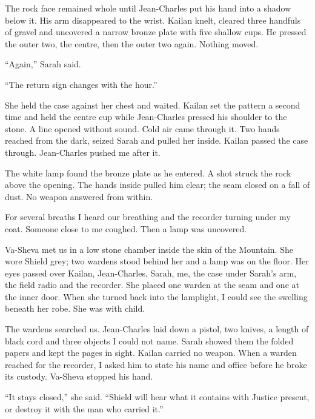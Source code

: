 The rock face remained whole until Jean-Charles put his hand into a shadow below it. His arm disappeared to the wrist. Kailan knelt, cleared three handfuls of gravel and uncovered a narrow bronze plate with five shallow cups. He pressed the outer two, the centre, then the outer two again. Nothing moved.\par

``Again,'' Sarah said.\par

``The return sign changes with the hour.''\par

She held the case against her chest and waited. Kailan set the pattern a second time and held the centre cup while Jean-Charles pressed his shoulder to the stone. A line opened without sound. Cold air came through it. Two hands reached from the dark, seized Sarah and pulled her inside. Kailan passed the case through. Jean-Charles pushed me after it.\par

The white lamp found the bronze plate as he entered. A shot struck the rock above the opening. The hands inside pulled him clear; the seam closed on a fall of dust. No weapon answered from within.\par

For several breaths I heard our breathing and the recorder turning under my coat. Someone close to me coughed. Then a lamp was uncovered.\par

\ornament

Va-Sheva met us in a low stone chamber inside the skin of the Mountain. She wore Shield grey; two wardens stood behind her and a lamp was on the floor. Her eyes passed over Kailan, Jean-Charles, Sarah, me, the case under Sarah's arm, the field radio and the recorder. She placed one warden at the seam and one at the inner door. When she turned back into the lamplight, I could see the swelling beneath her robe. She was with child.\par

The wardens searched us. Jean-Charles laid down a pistol, two knives, a length of black cord and three objects I could not name. Sarah showed them the folded papers and kept the pages in sight. Kailan carried no weapon. When a warden reached for the recorder, I asked him to state his name and office before he broke its custody. Va-Sheva stopped his hand.\par

``It stays closed,'' she said. ``Shield will hear what it contains with Justice present, or destroy it with the man who carried it.''\par


